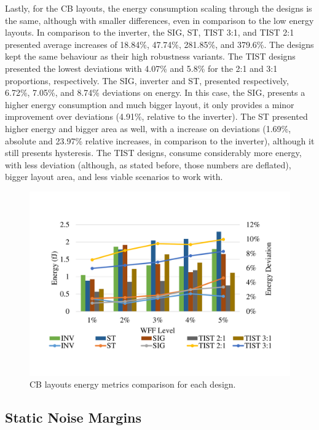 \documentclass[pgmicro,mestrado,english]{iiufrgs}
\begin{document}
    Lastly, for the CB layouts, the energy consumption scaling through the designs is the same, although with smaller differences, even in comparison to the low energy layouts. In comparison to the inverter, the SIG, ST, TIST 3:1, and TIST 2:1 presented average increases of 18.84\%, 47.74\%, 281.85\%, and 379.6\%. The designs kept the same behaviour as their high robustness variants. The TIST designs presented the lowest deviations with 4.07\% and 5.8\% for the 2:1 and 3:1 proportions, respectively. The SIG, inverter and ST, presented respectively, 6.72\%, 7.05\%, and 8.74\% deviations on energy. In this case, the SIG, presents a higher energy consumption and much bigger layout, it only provides a minor improvement over deviations (4.91\%, relative to the inverter). The ST presented higher energy and bigger area as well, with a increase on deviations (1.69\%, absolute and 23.97\% relative increases, in comparison to the inverter), although it still presents hysteresis. The TIST designs, consume considerably more energy, with less deviation (although, as stated before, those numbers are deflated), bigger layout area, and less viable scenarios to work with.

    \begin{figure}[]
        \centering
            \includegraphics[width=1\textwidth, trim={1.25cm 3cm 2cm 3cm}, clip]{compCB.pdf}
            \caption{CB layouts energy metrics comparison for each design.}
        \label{figCompCB}
    \end{figure}


\subsection{Static Noise Margins}
\end{document}
